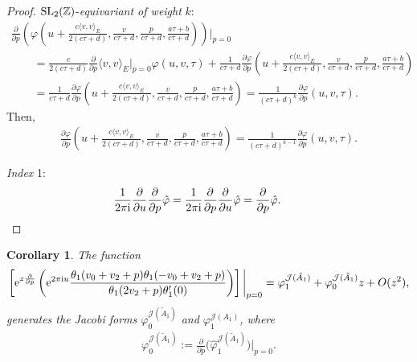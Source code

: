 \documentclass[pdftex]{sigma}%
\numberwithin{equation}{section}
\newtheorem{Corollary}[Theorem]{Corollary}
\newcommand{\Ja}{\mathcal{J}}
\begin{document}
\begin{proof}
${\rm SL}_2(\mathbb{Z})$-\emph{equivariant of weight} $k$:
\begin{gather*}
\frac{\partial}{\partial p}\left(\varphi\left(u+\frac{c\langle v,v \rangle_{E}}{2(c\tau+d)},\frac{v}{c\tau+d},\frac{p}{c\tau+d},\frac{a\tau+b}{c\tau+d}\right) \right)\bigg |_{p=0}
\\ \qquad
=\frac{c}{2(c\tau\! +d)}\frac{\partial}{\partial p} \langle v, v\rangle_E \bigg |_{p=0}\!\varphi(u,v,\tau)\!+\!\frac{1}{c\tau\!+d}\frac{\partial \varphi}{\partial p}\left(\!u + \frac{c\langle v,v \rangle_{E}}{2(c\tau\!+d)},\frac{v}{c\tau\!+d},\frac{p}{c\tau\!+d},\frac{a\tau\!+b}{c\tau\!+d}\right)
\\ \qquad
=\frac{1}{c\tau+d}\frac{\partial \varphi}{\partial p}\left(u+\frac{c\langle v,v \rangle_{E}}{2(c\tau+d)},\frac{v}{c\tau+d},\frac{p}{c\tau+d},\frac{a\tau+b}{c\tau+d}\right)
=\frac{1}{(c\tau+d)^k}\frac{\partial \varphi}{\partial p}(u,v,\tau).
\end{gather*}
Then,
\begin{gather*}
\frac{\partial \varphi}{\partial p}\left(u+\frac{c\langle v,v \rangle_{E}}{2(c\tau+d)},\frac{v}{c\tau+d},\frac{p}{c\tau+d},\frac{a\tau+b}{c\tau+d}\right)
=\frac{1}{(c\tau+d)^{k-1}}\frac{\partial \varphi}{\partial p}(u,v,\tau).
\end{gather*}

\emph{Index} 1:
\begin{gather*}
\frac{1}{2\pi {\rm i}}\frac{\partial}{\partial u}\frac{\partial}{\partial p}\hat\varphi=\frac{1}{2\pi {\rm i}}\frac{\partial}{\partial p}\frac{\partial}{\partial u}\hat\varphi=\frac{\partial}{\partial p}\hat\varphi.
\tag*{\qed}
\end{gather*}
\renewcommand{\qed}{}
\end{proof}

\begin{Corollary}
The function
\begin{gather*}
\left[ {\rm e}^{z\frac{\partial}{\partial p} } \left({\rm e}^{2\pi {\rm i} u}\frac{\theta_1(v_0+v_2+p)\theta_1(-v_0+v_2+p)}{\theta_1(2v_2+p)\theta_1^{\prime}(0)}\right) \right]\bigg |_{p=0}=\varphi_1^{\Ja(\tilde A_1)}+\varphi_0^{\Ja(\tilde A_1)}z+O(z^2),
\end{gather*}
generates the Jacobi forms $\varphi_0^{\Ja(\tilde A_1)}$ and $\varphi_1^{\Ja(A_1)}$,
where
\begin{gather*}
\varphi_0^{\Ja(\tilde A_1)}:=\frac{\partial }{\partial p}\big(\hat\varphi_1^{\Ja(\tilde A_1)} \big)\bigg |_{p=0}.
\end{gather*}
\end{Corollary}
\end{document}
